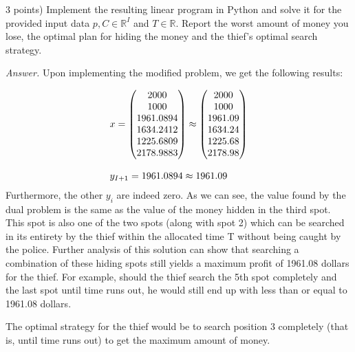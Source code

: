 \documentclass[10pt]{article}
\newenvironment{exercise}[2][Exercise]{\begin{trivlist}
  \item[\hskip \labelsep {\bfseries #1}\hskip \labelsep {\bfseries #2.}]}{\end{trivlist}}
\begin{document}
\begin{exercise}{5.5} (3 points) Implement the resulting linear program in Python and solve it for the provided input data $p, C \in \mathbb{R}^I$ and $T \in \mathbb{R}$. Report the worst amount of money you lose, the optimal plan for hiding the money and the thief's optimal search strategy. 

\textit{Answer.}
Upon implementing the modified problem, we get the following results:

\begin{equation}
\begin{array}{ll@{}lll}
x = \begin{pmatrix}
2000\\
1000\\
1961.0894\\
1634.2412\\
1225.6809\\
2178.9883\\
\end{pmatrix} 
\approx 
\begin{pmatrix}
2000\\
1000\\
1961.09\\
1634.24\\
1225.68\\
2178.98\\
\end{pmatrix}

\\ \\

y_{I+1} = 1961.0894 \approx 1961.09
\end{array}
\end{equation}
Furthermore, the other $y_i$ are indeed zero. As we can see, the value found by the dual problem is the same as the value of the money hidden in the third spot. This spot is also one of the two spots (along with spot 2) which can be searched in its entirety by the thief within the allocated time T without being caught by the police. Further analysis of this solution can show that searching a combination of these hiding spots still yields a maximum profit of 1961.08 dollars for the thief. For example, should the thief search the 5th spot completely and the last spot until time runs out, he would still end up with less than or equal to 1961.08 dollars.

The optimal strategy for the thief would be to search position 3 completely (that is, until time runs out) to get the maximum amount of money.




\end{exercise}
\end{document}
